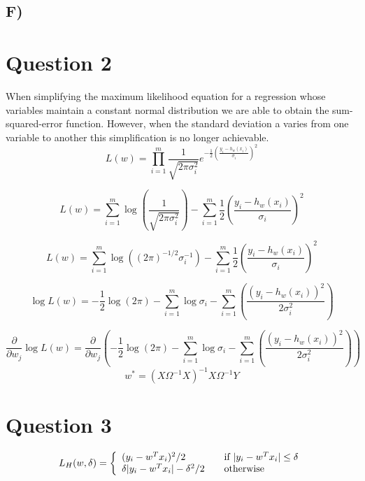 \documentclass{report}
\begin{document}
\subsection*{F)}

\section*{Question 2}
When simplifying the maximum likelihood equation for a regression whose variables
maintain a constant normal distribution we are able to obtain the sum-squared-error
function. However, when the standard deviation a varies from one variable to another
this simplification is no longer achievable.
  \begin{equation}
     L(w) = \prod_{i=1}^{m} \frac{1}{\sqrt{2\pi\sigma_i^2}}e ^ {-\frac{1}{2}\left(\frac{y_i-h_w(x_i)}{\sigma_i}\right)^2}
  \end{equation}

  \begin{equation}
     L(w) = \sum_{i=1}^{m} \log \left(\frac{1}{\sqrt{2\pi\sigma_i^2}}\right) - \sum_{i=1}^{m} \frac{1}{2}\left(\frac{y_i-h_w(x_i)}{\sigma_i}\right)^2
  \end{equation}

  \begin{equation}
     L(w) = \sum_{i=1}^{m} \log \left((2\pi)^{-1/2}\sigma_i^{-1}\right) - \sum_{i=1}^{m} \frac{1}{2}\left(\frac{y_i-h_w(x_i)}{\sigma_i}\right)^2
  \end{equation}

  \begin{equation}
     \log L(w) = -\frac{1}{2} \log(2\pi) - \sum_{i=1}^{m} \log \sigma_i - \sum_{i=1}^{m} \left(\frac{(y_i-h_w(x_i))^2}{2\sigma_i^2}\right)
  \end{equation}

\begin{equation}
     \frac{\partial}{\partial w_j} \log L(w) = \frac{\partial}{\partial w_j} \left(-\frac{1}{2} \log(2\pi) - \sum_{i=1}^{m} \log \sigma_i - \sum_{i=1}^{m} \left(\frac{(y_i-h_w(x_i))^2}{2\sigma_i^2}\right)\right)
\end{equation}
\begin{equation}
     w^* = (X\Omega^{-1} X)^{-1} X\Omega^{-1} Y
\end{equation}


\section*{Question 3}
\begin{equation}
  L_H(w, \delta) = \left\{
  \begin{array}{l l}
    (y_i - w^Tx_i)^2 / 2 & \quad \text{if }  | y_i - w^Tx_i | \leq \delta\\
    \delta | y_i - w^Tx_i | - \delta^2 / 2 & \quad \text{otherwise}

  \end{array} \right.\end{equation}
\end{document}
